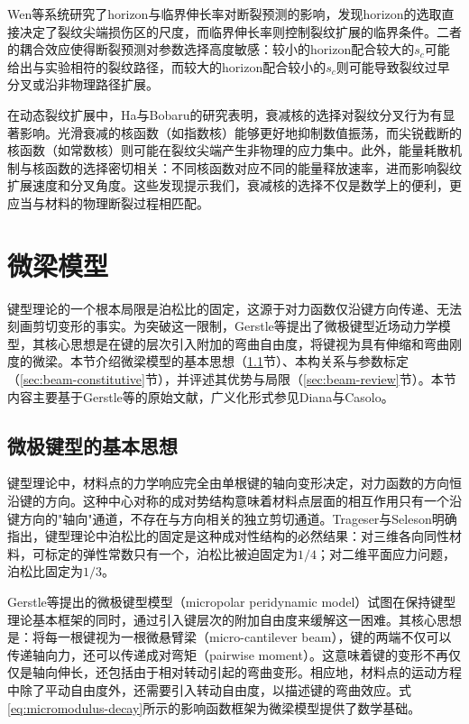 Wen等\cite{EWF2023}系统研究了horizon与临界伸长率对断裂预测的影响，发现horizon的选取直接决定了裂纹尖端损伤区的尺度，而临界伸长率则控制裂纹扩展的临界条件。二者的耦合效应使得断裂预测对参数选择高度敏感：较小的horizon配合较大的$s_{c}$可能给出与实验相符的裂纹路径，而较大的horizon配合较小的$s_{c}$则可能导致裂纹过早分叉或沿非物理路径扩展。

在动态裂纹扩展中，Ha与Bobaru\cite{HaBobaru2010}的研究表明，衰减核的选择对裂纹分叉行为有显著影响。光滑衰减的核函数（如指数核）能够更好地抑制数值振荡，而尖锐截断的核函数（如常数核）则可能在裂纹尖端产生非物理的应力集中。此外，能量耗散机制与核函数的选择密切相关：不同核函数对应不同的能量释放速率，进而影响裂纹扩展速度和分叉角度。这些发现提示我们，衰减核的选择不仅是数学上的便利，更应当与材料的物理断裂过程相匹配。


\section{微梁模型}\label{sec:micropolar-beam}

键型理论的一个根本局限是泊松比的固定，这源于对力函数仅沿键方向传递、无法刻画剪切变形的事实。为突破这一限制，Gerstle等\cite{Gerstle2007}提出了微极键型近场动力学模型，其核心思想是在键的层次引入附加的弯曲自由度，将键视为具有伸缩和弯曲刚度的微梁。本节介绍微梁模型的基本思想（\ref{sec:micropolar-idea}节）、本构关系与参数标定（\ref{sec:beam-constitutive}节），并评述其优势与局限（\ref{sec:beam-review}节）。本节内容主要基于Gerstle等\cite{Gerstle2007}的原始文献，广义化形式参见Diana与Casolo\cite{DianaCasolo2019}。

\subsection{微极键型的基本思想}\label{sec:micropolar-idea}

键型理论中，材料点的力学响应完全由单根键的轴向变形决定，对力函数的方向恒沿键的方向。这种中心对称的成对势结构意味着材料点层面的相互作用只有一个沿键方向的"轴向"通道，不存在与方向相关的独立剪切通道。Trageser与Seleson\cite{TrageserSeleson2020}明确指出，键型理论中泊松比的固定是这种成对性结构的必然结果：对三维各向同性材料，可标定的弹性常数只有一个，泊松比被迫固定为$1/4$；对二维平面应力问题，泊松比固定为$1/3$。

Gerstle等\cite{Gerstle2007}提出的微极键型模型（micropolar peridynamic model）试图在保持键型理论基本框架的同时，通过引入键层次的附加自由度来缓解这一困难。其核心思想是：将每一根键视为一根微悬臂梁（micro-cantilever beam），键的两端不仅可以传递轴向力，还可以传递成对弯矩（pairwise moment）。这意味着键的变形不再仅仅是轴向伸长，还包括由于相对转动引起的弯曲变形。相应地，材料点的运动方程中除了平动自由度外，还需要引入转动自由度，以描述键的弯曲效应。式\eqref{eq:micromodulus-decay}所示的影响函数框架为微梁模型提供了数学基础。


